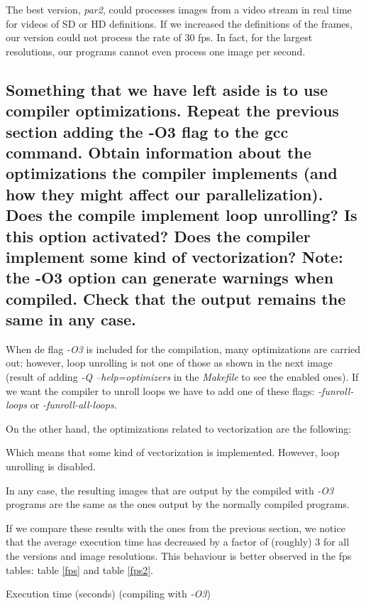 \documentclass{article}
\newcommand{\question}[1]{\subsection{#1}}
\begin{document}
The best version, \emph{par2}, could processes images from a 
video stream in real time for videos of SD or HD definitions. If we increased the definitions of the frames, our version could not process the rate of 30 fps. In fact, for the largest resolutions, our programs cannot even process one image per second.

\question{Something that we have left aside is to use compiler optimizations. Repeat the previous section adding the -O3 flag to the gcc command. Obtain information about the optimizations the compiler implements (and how they might affect our parallelization). Does the compile implement loop unrolling? Is this option activated? Does the compiler implement some kind of vectorization? Note: the -O3 option can generate warnings when compiled. Check that the output remains the same in any case.}


When de flag \emph{-O3} is included for the compilation, many optimizations are carried out; however, loop unrolling is not one of those as shown in the next image (result of adding \emph{-Q --help=optimizers} in the \emph{Makefile} to see the enabled ones). If we want the compiler to unroll loops we have to add one of these flags: \emph{-funroll-loops} or \emph{-funroll-all-loops}.

\vspace{5pt}



On the other hand, the optimizations related to vectorization are the following:

\vspace{5pt}



Which means that some kind of vectorization is implemented. However, loop unrolling is disabled. 

In any case, the resulting images that are output by the compiled with \emph{-O3} programs are the same as the ones output by the normally compiled programs.

If we compare these results with the ones from the previous section, we notice that the average execution time has decreased by a factor of (roughly) 3 for all the versions and image resolutions. This behaviour is better observed in the fps tables: table \ref{fps} and table \ref{fps2}.


\begin{table}[h]
    
    \centering
    \caption{Execution time (seconds) (compiling with \emph{-O3})}
\end{table}
\end{document}
